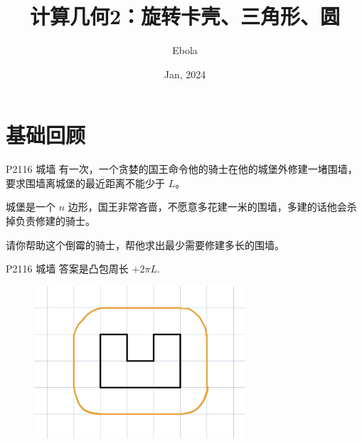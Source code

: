 \documentclass{beamer}
\author{Ebola}
\title{计算几何2：旋转卡壳、三角形、圆}
\institute{
    Institute of Mathematics, \\
    Zhejiang University.
}
\date{Jan, 2024}
\begin{document}
\begin{frame}
    \titlepage
\end{frame}

\begin{frame}
    \tableofcontents[sectionstyle=show,subsectionstyle=show/shaded/hide,subsubsectionstyle=show/shaded/hide]
\end{frame}

\section{基础回顾}

\begin{frame}[fragile]{P2116 城墙}
有一次，一个贪婪的国王命令他的骑士在他的城堡外修建一堵围墙，要求围墙离城堡的最近距离不能少于 $L$。

城堡是一个 $n$ 边形，国王非常吝啬，不愿意多花建一米的围墙，多建的话他会杀掉负责修建的骑士。

请你帮助这个倒霉的骑士，帮他求出最少需要修建多长的围墙。
\end{frame}

\begin{frame}[fragile]{P2116 城墙}
答案是凸包周长 $+2\pi L$.

\begin{figure}[H]
    \centering
    \includegraphics[width=0.7\textwidth]{pic/p2116.jpg}
\end{figure}
\end{frame}
\end{document}

